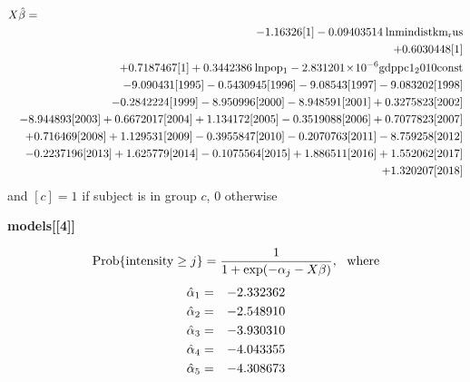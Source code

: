 \begin{eqnarray*}
\lefteqn{X\hat{\beta}=}\\
& &  -1.16326[{\rm 1}] -0.09403514\:{\rm lnmindistkm_rus} \\
& &  +0.6030448[{\rm 1}] \\
& &  +0.7187467[{\rm 1}] +0.3442386\:{\rm lnpop_{1}} -2.831201\!\times\!10^{-6}{\rm gdppc1_2010const} \\
& &  -9.090431 [{\rm 1995}]-0.5430945[{\rm 1996}]-9.08543  [{\rm 1997}]-9.083202 [{\rm 1998}] \\
& &  -0.2842224[{\rm 1999}]-8.950996 [{\rm 2000}]-8.948591 [{\rm 2001}]+0.3275823 [{\rm 2002}] \\
& &  -8.944893 [{\rm 2003}]+0.6672017 [{\rm 2004}]+1.134172  [{\rm 2005}]-0.3519088[{\rm 2006}]+0.7077823 [{\rm 2007}] \\
& &  +0.716469  [{\rm 2008}]+1.129531  [{\rm 2009}]-0.3955847[{\rm 2010}]-0.2070763[{\rm 2011}]-8.759258 [{\rm 2012}] \\
& &  -0.2237196[{\rm 2013}]+1.625779  [{\rm 2014}]-0.1075564[{\rm 2015}]+1.886511  [{\rm 2016}]+1.552062  [{\rm 2017}] \\
& &  +1.320207  [{\rm 2018}] \\
\end{eqnarray*}
and \([c]=1\) if subject is in group \(c\), 0 otherwise
\begin{center} \bf models[[4]] \end{center}
\[{\rm Prob}\{{\rm intensity}\geq j\} = \frac{1}{1+\exp(-\alpha_{j}-X\beta)}, {\rm \ \ where} \\ \]
\begin{eqnarray*}
\hat{\alpha}_{\rm 1} &=&-2.332362\\
\hat{\alpha}_{\rm 2} &=&-2.548910\\
\hat{\alpha}_{\rm 3} &=&-3.930310\\
\hat{\alpha}_{\rm 4} &=&-4.043355\\
\hat{\alpha}_{\rm 5} &=&-4.308673\\
\end{eqnarray*}

